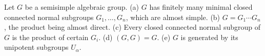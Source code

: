 Let $G$ be a semisimple algebraic group.
(a) $G$ has finitely many minimal closed connected normal subgroups $G_1, \ldots, G_n$, which are almost simple.
(b) $G = G_1 \cdots G_n$, the product being almost direct.
(c) Every closed connected normal subgroup of $G$ is the product of certain $G_i$.
(d) $(G, G) = G$.
(e) $G$ is generated by its unipotent subgroups $U_\alpha$.
